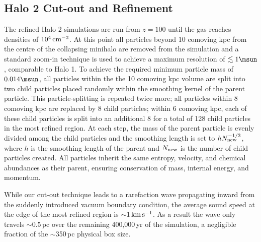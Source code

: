 \subsection{Halo 2 Cut-out and Refinement}
\label{cutout}

The refined Halo 2 simulations are run from $z=100$ until the gas reaches densities of $10^4\,{\rm cm}^{-3}$.  At this point all particles beyond 10 comoving kpc from the centre of the collapsing minihalo are removed from the simulation and a standard zoom-in technique is used to achieve a maximum resolution of $\lesssim 1\msun$, comparable to Halo 1. To achieve the required minimum particle mass of $0.014\msun$, all particles within the the 10 comoving kpc volume are split into two child particles placed randomly within the smoothing kernel of the parent particle.  This particle-splitting is repeated twice more; all particles within 8 comoving kpc are replaced by 8 child particles; within 6 comoving kpc, each of these child particles is split into an additional 8 for a total of 128 child particles in the most refined region.  At each step, the mass of the parent particle is evenly divided among the child particles and the smoothing length is set to $h N_{\rm new}^{-1/3}$, where $h$ is the smoothing length of the parent and $N_{\rm new}$ is the number of child particles created.  All particles inherit the same entropy, velocity, and chemical abundances as their parent, ensuring conservation of mass, internal energy, and momentum.

While our cut-out technique leads to a rarefaction wave propagating inward from the suddenly introduced vacuum boundary condition, the average sound speed at the edge of the most refined region is $\sim$$1\,{\rm km}\,{\rm s}^{-1}$.  As a result the wave only travels $\sim$$0.5\,$pc over the remaining 400,000$\,$yr of the simulation, a negligible fraction of the $\sim$350$\,$pc physical box size.